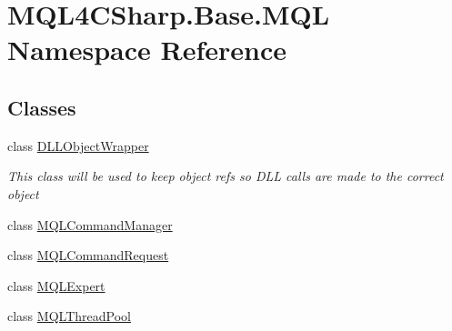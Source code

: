 \hypertarget{namespace_m_q_l4_c_sharp_1_1_base_1_1_m_q_l}{}\section{M\+Q\+L4\+C\+Sharp.\+Base.\+M\+QL Namespace Reference}
\label{namespace_m_q_l4_c_sharp_1_1_base_1_1_m_q_l}
\subsection*{Classes}
\begin{DoxyCompactItemize}
\item 
class \hyperlink{class_m_q_l4_c_sharp_1_1_base_1_1_m_q_l_1_1_d_l_l_object_wrapper}{D\+L\+L\+Object\+Wrapper}
\begin{DoxyCompactList}\small\item\em This class will be used to keep object refs so D\+LL calls are made to the correct object \end{DoxyCompactList}\item 
class \hyperlink{class_m_q_l4_c_sharp_1_1_base_1_1_m_q_l_1_1_m_q_l_command_manager}{M\+Q\+L\+Command\+Manager}
\item 
class \hyperlink{class_m_q_l4_c_sharp_1_1_base_1_1_m_q_l_1_1_m_q_l_command_request}{M\+Q\+L\+Command\+Request}
\item 
class \hyperlink{class_m_q_l4_c_sharp_1_1_base_1_1_m_q_l_1_1_m_q_l_expert}{M\+Q\+L\+Expert}
\item 
class \hyperlink{class_m_q_l4_c_sharp_1_1_base_1_1_m_q_l_1_1_m_q_l_thread_pool}{M\+Q\+L\+Thread\+Pool}
\end{DoxyCompactItemize}
